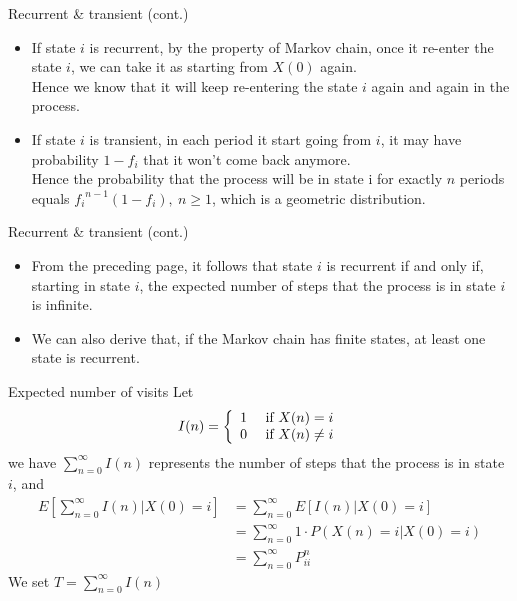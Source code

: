 \documentclass[mathserif]{beamer}
\begin{document}
\begin{frame}{Recurrent \& transient (cont.)}
	\begin{itemize}
	\item If state $i$ is recurrent, by the property of Markov chain, 
		once it re-enter the state $i$, we can take it as starting from $X(0)$ again. \\
		Hence we know that it will keep re-entering the state $i$ again and again in the process.
	\item If state $i$ is transient, in each period it start going from $i$,
		it may have probability $1 - f_i$ that it won't come back anymore. \\
		Hence the probability that the process will be in state i for exactly $n$ periods equals
		${f_i}^{n-1}(1-f_i), ~n \geq 1$, which is a geometric distribution.
	\end{itemize}
\end{frame}

\begin{frame}{Recurrent \& transient (cont.)}
	\begin{itemize}
	\item From the preceding page, it follows that state $i$ is recurrent if and only if,
		starting in state $i$, the expected number of steps that the process is in state $i$ is infinite.
	\item We can also derive that, if the Markov chain has finite states, at least one state is recurrent.
	\end{itemize}
\end{frame}

\begin{frame}{Expected number of visits}
	Let 
	\[
	I(n) = \left\{
	\begin{array}{l l}
		1 & ~\text{if $X(n) = i$}\\
		0 & ~\text{if $X(n) \neq i$} \\
	\end{array} \right.
	\]
	we have $\sum_{n=0}^\infty I(n)$ represents the number of steps that the process is in state $i$, and
	\begin{align*}
	E\left[ \sum_{n=0}^\infty I(n)|X(0) = i \right] & = \sum_{n=0}^\infty E[I(n)|X(0)=i] \\
	& = \sum_{n=0}^\infty 1 \cdot P(X(n)=i|X(0)=i) \\
	& = \sum_{n=0}^\infty P^n_{ii}
	\end{align*}
	We set $T = \sum_{n=0}^\infty I(n)$
\end{frame}
\end{document}
